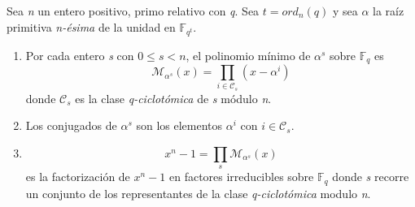 \begin{theorem}
\label{th:factorizar_xn}
Sea \textit{n} un entero positivo, primo relativo con \textit{q}. Sea $t = ord_n(q)$ y sea $\alpha$ la raíz primitiva \textit{n-ésima} de la unidad en $\mathbb{F}_{q^t}$.
\begin{enumerate}

	\item Por cada entero \textit{s} con $0 \leq s < n$, el polinomio mínimo de $\alpha^s$ sobre  $\mathbb{F}_q$ es
	\[
	\mathcal{M}_{\alpha^s}(x) = \prod_{i \in \mathcal{C}_s} (x-\alpha^i)
	\] 
	donde $\mathcal{C}_s$ es la clase \textit{q-ciclotómica} de \textit{s} módulo \textit{n}.
	\item  Los conjugados de $\alpha^s$ son los elementos $\alpha^i$ con $i \in \mathcal{C}_s$.
	\item  
	\[
	x^n-1 =  \prod_{s} \mathcal{M}_{\alpha^s}(x) 
	\]
	es la factorización de $x^n-1$ en factores irreducibles sobre $\mathbb{F}_q$ donde \textit{s} recorre un conjunto de los representantes de la clase \textit{q-ciclotómica} modulo \textit{n}.
\end{enumerate}
\end{theorem}
 
